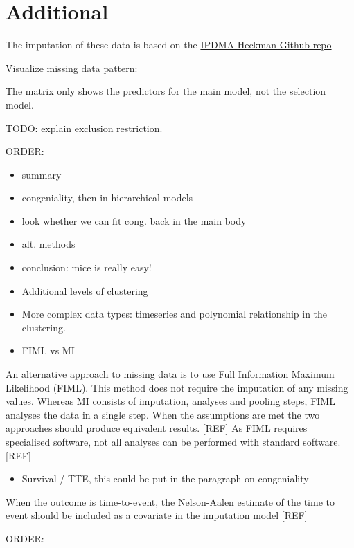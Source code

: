 \documentclass[
]{jss}
\providecommand{\tightlist}{%
  \setlength{\itemsep}{0pt}\setlength{\parskip}{0pt}}
\begin{document}
\hypertarget{additional}{%
\section{Additional}\label{additional}}

The imputation of these data is based on the
\href{https://github.com/johamunoz/Heckman-IPDMA/blob/main/Toy_example.R}{IPDMA
Heckman Github repo}

Visualize missing data pattern:

The matrix only shows the predictors for the main model, not the
selection model.

TODO: explain exclusion restriction.

ORDER:

\begin{itemize}
\item
  summary
\item
  congeniality, then in hierarchical models
\item
  look whether we can fit cong. back in the main body
\item
  alt. methods
\item
  conclusion: mice is really easy!
\item
  Additional levels of clustering
\item
  More complex data types: timeseries and polynomial relationship in the
  clustering.
\item
  FIML vs MI
\end{itemize}

An alternative approach to missing data is to use Full Information
Maximum Likelihood (FIML). This method does not require the imputation
of any missing values. Whereas MI consists of imputation, analyses and
pooling steps, FIML analyses the data in a single step. When the
assumptions are met the two approaches should produce equivalent
results. {[}REF{]} As FIML requires specialised software, not all
analyses can be performed with standard software. {[}REF{]}

\begin{itemize}
\tightlist
\item
  Survival / TTE, this could be put in the paragraph on congeniality
\end{itemize}

When the outcome is time-to-event, the Nelson-Aalen estimate of the time
to event should be included as a covariate in the imputation model
{[}REF{]}

ORDER:
\end{document}
